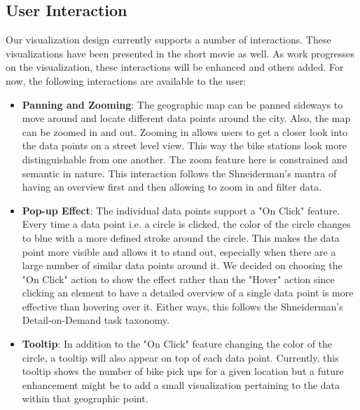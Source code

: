 \subsection{User Interaction}
Our visualization design currently supports a number of interactions. These visualizations have been presented in the short movie as well. As work progresses on the visualization, these interactions will be enhanced and others added. For now, the following interactions are available to the user:
\begin{itemize}
    \item \textbf{Panning and Zooming}: The geographic map can be panned sideways to move around and locate different data points around the city. Also, the map can be zoomed in and out. Zooming in allows users to get a closer look into the data points on a street level view. This way the bike stations look more distinguishable from one another. The zoom feature here is constrained and semantic in nature. This interaction follows the Shneiderman's mantra of having an overview first and then allowing to zoom in and filter data.
    \item \textbf{Pop-up Effect}: The individual data points support a "On Click" feature. Every time a data point i.e. a circle is clicked, the color of the circle changes to blue with a more defined stroke around the circle. This makes the data point more visible and allows it to stand out, especially when there are a large number of similar data points around it. We decided on choosing the "On Click" action to show the effect rather than the "Hover" action since clicking an element to have a detailed overview of a single data point is more effective than hovering over it. Either ways, this follows the Shneiderman's Detail-on-Demand task taxonomy.
    \item \textbf{Tooltip}: In addition to the "On Click" feature changing the color of the circle, a tooltip will also appear on top of each data point. Currently, this tooltip shows the number of bike pick ups for a given location but a future enhancement might be to add a small visualization pertaining to the data within that geographic point.
\end{itemize}
